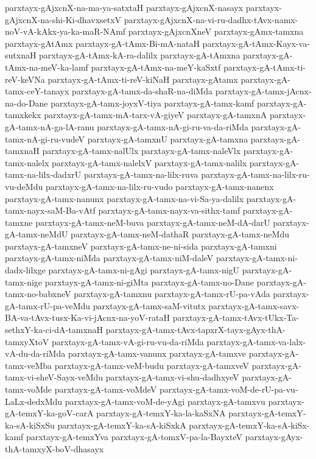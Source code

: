 {parxtayx-gAjxcnX-na-ma-ya-satxtaH
parxtayx-gAjxcnX-nasayx
parxtayx-gAjxcnX-na-shi-Ki-dhavxsetxV
parxtayx-gAjxcnX-na-vi-ru-dadhx-tAvx-namx-noV-vA-kAkx-ya-ka-maR-NAmf
parxtayx-gAjxcnXneV
parxtayx-gAmx-tamxna
parxtayx-gAtAmx
parxtayx-gA-tAmx-Bi-mA-nataH
parxtayx-gA-tAmx-Kayx-va-sutxnaH
parxtayx-gA-tAmx-kA-ra-dalilx
parxtayx-gA-tAmxna
parxtayx-gA-tAmx-na-meV-ka-lamf
parxtayx-gA-tAmx-na-meY-kaSxtf
parxtayx-gA-tAmx-ti-reV-keVNa
parxtayx-gA-tAmx-ti-reV-kiNaH
parxtayx-gAtamx
parxtayx-gA-tamx-ceY-tanayx
parxtayx-gA-tamx-da-shaR-na-diMda
parxtayx-gA-tamx-jAcnx-na-do-Dane
parxtayx-gA-tamx-joyxV-tiya
parxtayx-gA-tamx-kamf
parxtayx-gA-tamxkekx
parxtayx-gA-tamx-mA-tarx-vA-giyeV
parxtayx-gA-tamxnA
parxtayx-gA-tamx-nA-ga-lA-ranu
parxtayx-gA-tamx-nA-gi-ru-va-da-riMda
parxtayx-gA-tamx-nA-gi-ru-vudeV
parxtayx-gA-tamxnU
parxtayx-gA-tamxna
parxtayx-gA-tamxnaH
parxtayx-gA-tamx-nalUlx
parxtayx-gA-tamx-naleVlx
parxtayx-gA-tamx-nalelx
parxtayx-gA-tamx-nalelxV
parxtayx-gA-tamx-nalilx
parxtayx-gA-tamx-na-lilx-dadxrU
parxtayx-gA-tamx-na-lilx-ruva
parxtayx-gA-tamx-na-lilx-ru-vu-deMdu
parxtayx-gA-tamx-na-lilx-ru-vudo
parxtayx-gA-tamx-nanenx
parxtayx-gA-tamx-nanunx
parxtayx-gA-tamx-na-vi-Sa-ya-dalilx
parxtayx-gA-tamx-nayx-saM-Ba-vAtf
parxtayx-gA-tamx-nayx-va-sithx-tamf
parxtayx-gA-tamxne
parxtayx-gA-tamx-neM-buva
parxtayx-gA-tamx-neM-dA-darU
parxtayx-gA-tamx-neMdU
parxtayx-gA-tamx-neM-dathaR
parxtayx-gA-tamx-neMdu
parxtayx-gA-tamxneV
parxtayx-gA-tamx-ne-ni-sida
parxtayx-gA-tamxni
parxtayx-gA-tamx-niMda
parxtayx-gA-tamx-niM-daleV
parxtayx-gA-tamx-ni-dadx-lilxge
parxtayx-gA-tamx-ni-gAgi
parxtayx-gA-tamx-nigU
parxtayx-gA-tamx-nige
parxtayx-gA-tamx-ni-giMta
parxtayx-gA-tamx-no-Dane
parxtayx-gA-tamx-no-babxneV
parxtayx-gA-tamxnu
parxtayx-gA-tamx-rU-pa-vAda
parxtayx-gA-tamx-rU-pa-veMdu
parxtayx-gA-tamx-saM-vitutx
parxtayx-gA-tamx-savx-BA-va-tAvx-tusx-Ka-vi-jAcnx-na-yoV-rataH
parxtayx-gA-tamx-tAvx-tUkx-Ta-sethxY-ka-ci-dA-tamxnaH
parxtayx-gA-tamx-tAvx-tapxrX-tayx-gAyx-thA-tamxyXtoV
parxtayx-gA-tamx-vA-gi-ru-vu-da-riMda
parxtayx-gA-tamx-va-lalx-vA-du-da-riMda
parxtayx-gA-tamx-vanunx
parxtayx-gA-tamxve
parxtayx-gA-tamx-veMba
parxtayx-gA-tamx-veM-budu
parxtayx-gA-tamxveV
parxtayx-gA-tamx-vi-sheV-Sayx-veMdu
parxtayx-gA-tamx-vi-shu-dadhxyeV
parxtayx-gA-tamx-voMde
parxtayx-gA-tamx-voMdeV
parxtayx-gA-tamx-voM-de-rU-pa-vu-LaLx-dedxMdu
parxtayx-gA-tamx-voM-de-yAgi
parxtayx-gA-tamxvu
parxtayx-gA-temxY-ka-goV-carA
parxtayx-gA-temxY-ka-la-kaSxNA
parxtayx-gA-temxY-ka-sA-kiSxSu
parxtayx-gA-temxY-ka-sA-kiSxkA
parxtayx-gA-temxY-ka-sA-kiSx-kamf
parxtayx-gA-temxYva
parxtayx-gA-tomxV-pa-la-BayxteV
parxtayx-gAyx-thA-tamxyX-boV-dhasayx
}

